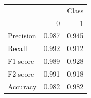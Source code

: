 \begin{tabular}{lrr}
\toprule
 & \multicolumn{2}{r}{Class} \\
 & 0 & 1 \\
\midrule
Precision & 0.987 & 0.945 \\
Recall & 0.992 & 0.912 \\
F1-score & 0.989 & 0.928 \\
F2-score & 0.991 & 0.918 \\
Accuracy & 0.982 & 0.982 \\
\bottomrule
\end{tabular}
